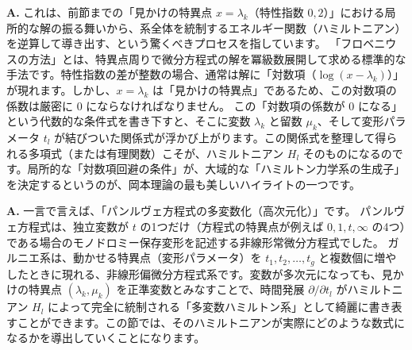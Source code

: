 \begin{Q}
\textbf{A.} これは、前節までの「見かけの特異点 $x=\lambda_k$（特性指数 $0, 2$）」における局所的な解の振る舞いから、系全体を統制するエネルギー関数（ハミルトニアン）を逆算して導き出す、という驚くべきプロセスを指しています。
「フロベニウスの方法」とは、特異点周りで微分方程式の解を冪級数展開して求める標準的な手法です。特性指数の差が整数の場合、通常は解に「対数項（$\log(x-\lambda_k)$）」が現れます。しかし、$x=\lambda_k$ は「見かけの特異点」であるため、この対数項の係数は厳密に $0$ にならなければなりません。
この「対数項の係数が $0$ になる」という代数的な条件式を書き下すと、そこに変数 $\lambda_k$ と留数 $\mu_k$、そして変形パラメータ $t_l$ が結びついた関係式が浮かび上がります。この関係式を整理して得られる多項式（または有理関数）こそが、ハミルトニアン $H_l$ そのものになるのです。局所的な「対数項回避の条件」が、大域的な「ハミルトン力学系の生成子」を決定するというのが、岡本理論の最も美しいハイライトの一つです。
\end{Q}

\begin{Q}
\textbf{A.} 一言で言えば、「パンルヴェ方程式の多変数化（高次元化）」です。
パンルヴェ方程式は、独立変数が $t$ の1つだけ（方程式の特異点が例えば $0, 1, t, \infty$ の4つ）である場合のモノドロミー保存変形を記述する非線形常微分方程式でした。
ガルニエ系は、動かせる特異点（変形パラメータ）を $t_1, t_2, \dots, t_g$ と複数個に増やしたときに現れる、非線形偏微分方程式系です。変数が多次元になっても、見かけの特異点 $(\lambda_k, \mu_k)$ を正準変数とみなすことで、時間発展 $\partial/\partial t_l$ がハミルトニアン $H_l$ によって完全に統制される「多変数ハミルトン系」として綺麗に書き表すことができます。この節では、そのハミルトニアンが実際にどのような数式になるかを導出していくことになります。
\end{Q}

